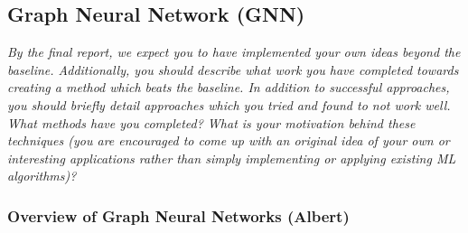 \documentclass{article}
\begin{document}




\subsection{Graph Neural Network (GNN)}

\textit{By the final report, we expect you to have implemented your own ideas beyond the baseline. Additionally, you should describe what work you have completed towards creating a method which beats the
baseline. In addition to successful approaches, you should briefly detail approaches which you tried and found to not work well. What methods have you completed? What is your motivation behind these techniques (you are encouraged to come up with an original idea of your own or interesting applications rather than simply implementing or applying existing ML algorithms)?}

\subsubsection{Overview of Graph Neural Networks (Albert)}
\end{document}
